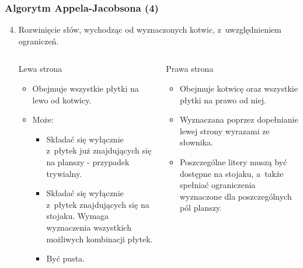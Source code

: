 \documentclass[10pt,a4paper]{beamer}
\begin{document}
\begin{frame}
	\frametitle{Algorytm Appela-Jacobsona (4)}
	
	\begin{enumerate}
		\setcounter{enumi}{3}
		\item Rozwinięcie słów, wychodząc od wyznaczonych kotwic, z~uwzględnieniem ograniczeń.
		
		\begin{columns}[t]
			\begin{column}{.5\textwidth}
				\begin{block}{Lewa strona}
					\begin{itemize}
						\item Obejmuje wszystkie płytki na lewo od kotwicy.
						\item Może:
							\begin{itemize}
								\item Składać się wyłącznie z~płytek już znajdujących się na planszy - przypadek trywialny.
								\item Składać się wyłącznie z~płytek znajdujących się na stojaku. Wymaga wyznaczenia wszystkich możliwych kombinacji płytek.
								\item Być pusta.
							\end{itemize}
					\end{itemize}
				\end{block}
			\end{column}
			\begin{column}{.5\textwidth}
				\begin{block}{Prawa strona}
					\begin{itemize}
						\item Obejmuje kotwicę oraz wszystkie płytki na prawo od niej.
						\item Wyznaczana poprzez dopełnianie lewej strony wyrazami ze słownika.
						\item Poszczególne litery muszą być dostępne na stojaku, a~także spełniać ograniczenia wyznaczone dla poszczególnych pól planszy.
					\end{itemize}
				\end{block}
			\end{column}
		\end{columns}
	\end{enumerate}
\end{frame}
\end{document}
